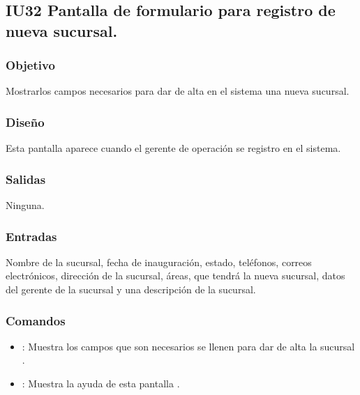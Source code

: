 
\subsection{IU32 Pantalla de formulario para registro de nueva sucursal.}

\subsubsection{Objetivo}
	Mostrarlos campos necesarios para dar de alta en el sistema una nueva sucursal.

\subsubsection{Diseño}
	Esta pantalla aparece cuando el gerente de operación se registro en el sistema.


\subsubsection{Salidas}

	Ninguna.

\subsubsection{Entradas}
	Nombre de la sucursal, fecha de inauguración, estado, teléfonos, correos electrónicos, dirección de la sucursal, áreas, que tendrá la nueva sucursal, datos del gerente de la sucursal y una descripción de la sucursal.

\subsubsection{Comandos}
\begin{itemize}
	\item {}: Muestra los campos que son necesarios se llenen para dar de alta la sucursal .
	\item {}: Muestra la ayuda de esta pantalla .
\end{itemize}

